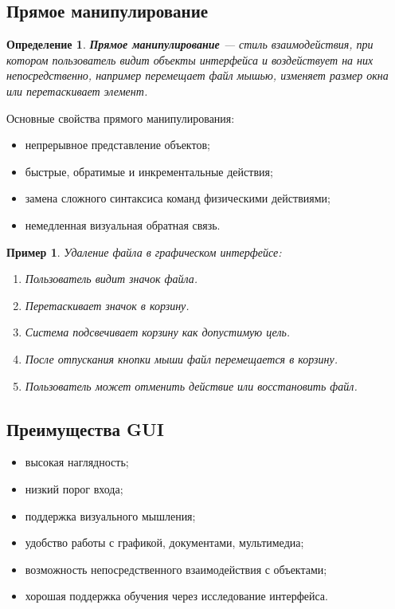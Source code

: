 \documentclass[12pt,a4paper]{article}
\newtheorem{definition}{Определение}
\newtheorem{example}{Пример}
\begin{document}
\subsection{Прямое манипулирование}

\begin{definition}
\textbf{Прямое манипулирование} --- стиль взаимодействия, при котором пользователь видит объекты интерфейса и воздействует на них непосредственно, например перемещает файл мышью, изменяет размер окна или перетаскивает элемент.
\end{definition}

Основные свойства прямого манипулирования:
\begin{itemize}
    \item непрерывное представление объектов;
    \item быстрые, обратимые и инкрементальные действия;
    \item замена сложного синтаксиса команд физическими действиями;
    \item немедленная визуальная обратная связь.
\end{itemize}

\begin{example}
Удаление файла в графическом интерфейсе:
\begin{enumerate}
    \item Пользователь видит значок файла.
    \item Перетаскивает значок в корзину.
    \item Система подсвечивает корзину как допустимую цель.
    \item После отпускания кнопки мыши файл перемещается в корзину.
    \item Пользователь может отменить действие или восстановить файл.
\end{enumerate}
\end{example}

\subsection{Преимущества GUI}

\begin{itemize}
    \item высокая наглядность;
    \item низкий порог входа;
    \item поддержка визуального мышления;
    \item удобство работы с графикой, документами, мультимедиа;
    \item возможность непосредственного взаимодействия с объектами;
    \item хорошая поддержка обучения через исследование интерфейса.
\end{itemize}
\end{document}
